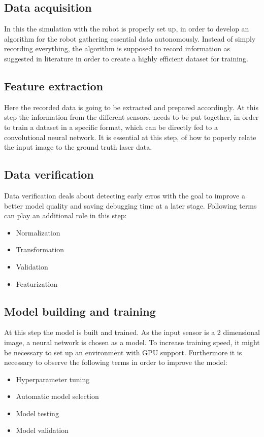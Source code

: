 \documentclass[a4paper,11pt,singlespacing]{article}
\begin{document}
\subsection{Data acquisition}
In this the simulation with the robot is properly set up, in order to develop an algorithm for the robot gathering essential data autonomously. Instead of simply recording everything, the algorithm is supposed to record information as suggested in literature in order to create a highly efficient dataset for training.

\subsection{Feature extraction}
Here the recorded data is going to be extracted and prepared accordingly. At this step the information from the different sensors, needs to be put together, in order to train a dataset in a specific format, which can be directly fed to a convolutional neural network. It is essential at this step, of how to poperly relate the input image to the ground truth laser data. 

\subsection{Data verification}
Data verification deals about detecting early erros with the goal to improve a better model quality and saving debugging time at a later stage. Following terms can play an additional role in this step:
\begin{itemize}
  \item Normalization
  \item Transformation
  \item Validation
  \item Featurization
\end{itemize}

\subsection{Model building and training}
At this step the model is built and trained. As the input sensor is a 2 dimensional image, a neural network is chosen as a model. To increase training speed, it might be necessary to set up an environment with GPU support. Furthermore it is necessary to observe the following terms in order to improve the model:
\begin{itemize}
  \item Hyperparameter tuning
  \item Automatic model selection
  \item Model testing
  \item Model validation
\end{itemize}
\end{document}
